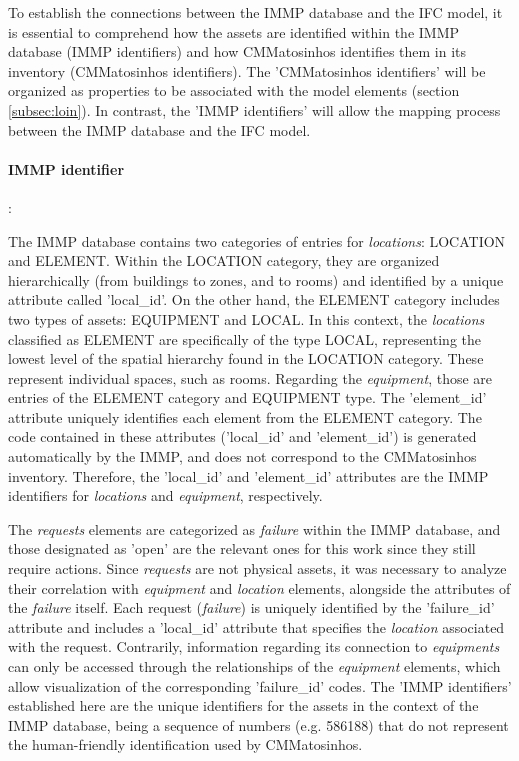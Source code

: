 \documentclass[a4paper, 10pt, twocolumn, twoside]{article}
\begin{document}
To establish the connections between the IMMP database and the IFC model, it is essential to comprehend how the assets are identified within the IMMP database (IMMP identifiers) and how CMMatosinhos identifies them in its inventory (CMMatosinhos identifiers). The 'CMMatosinhos identifiers' will be organized as properties to be associated with the model elements (section \ref{subsec:loin}). In contrast, the 'IMMP identifiers' will allow the mapping process between the IMMP database and the IFC model.

\paragraph{IMMP identifier}:

The IMMP database contains two categories of entries for \emph{locations}: LOCATION and ELEMENT. Within the LOCATION category, they are organized hierarchically (from buildings to zones, and to rooms) and identified by a unique attribute called 'local\_id'. On the other hand, the ELEMENT category includes two types of assets: EQUIPMENT and LOCAL. In this context, the \emph{locations} classified as ELEMENT are specifically of the type LOCAL, representing the lowest level of the spatial hierarchy found in the LOCATION category. These represent individual spaces, such as rooms. Regarding the \emph{equipment}, those are entries of the ELEMENT category and EQUIPMENT type. The 'element\_id' attribute uniquely identifies each element from the ELEMENT category. The code contained in these attributes ('local\_id' and 'element\_id') is generated automatically by the IMMP, and does not correspond to the CMMatosinhos inventory. Therefore, the 'local\_id' and 'element\_id' attributes are the IMMP identifiers for \emph{locations} and \emph{equipment}, respectively.

The \emph{requests} elements are categorized as \emph{failure} within the IMMP database, and those designated as 'open' are the relevant ones for this work since they still require actions. Since \emph{requests} are not physical assets, it was necessary to analyze their correlation with \emph{equipment} and \emph{location} elements, alongside the attributes of the \emph{failure} itself. Each request (\emph{failure}) is uniquely identified by the 'failure\_id' attribute and includes a 'local\_id' attribute that specifies the \emph{location} associated with the request. Contrarily, information regarding its connection to \emph{equipments} can only be accessed through the relationships of the \emph{equipment} elements, which allow visualization of the corresponding 'failure\_id' codes. The 'IMMP identifiers' established here are the unique identifiers for the assets in the context of the IMMP database, being a sequence of numbers (e.g. 586188) that do not represent the human-friendly identification used by CMMatosinhos.
\end{document}
